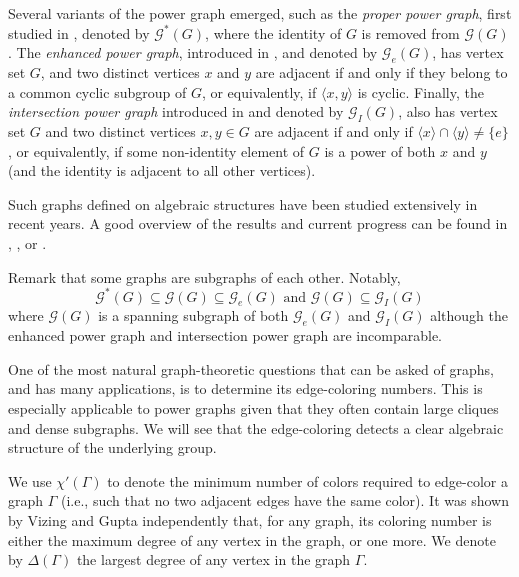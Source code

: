 \documentclass{article}
\theoremstyle{definition}
\theoremstyle{indentclaim}
\theoremstyle{named}
\theoremstyle{named}
\begin{document}
Several variants of the power graph emerged, such as the \textit{proper power graph}, first studied in \cite{MoghaddamfarRahbariyanShi}, denoted by $\mathscr{G}^{*}(G)$, where the identity of $G$ is removed from $\mathscr{G}(G)$. The \textit{enhanced power graph}, introduced in \cite{AalipourEtAl2017}, and denoted by $\mathscr{G}_{e}(G)$, has vertex set $G$, and two distinct vertices $x$ and $y$ are adjacent if and only if they belong to a common cyclic subgroup of $G$, or equivalently, if $\langle x,y\rangle$ is cyclic. Finally, the \textit{intersection power graph} introduced in \cite{Bera2018} and denoted by $\mathscr{G}_{I}(G)$, also has vertex set $G$ and two distinct vertices $x,y\in G$ are adjacent if and only if $\langle x\rangle\cap\langle y\rangle\neq\{e\}$, or equivalently, if some non-identity element of $G$ is a power of both $x$ and $y$ (and the identity is adjacent to all other vertices). 

Such graphs defined on algebraic structures have been studied extensively in recent years. A good overview of the results and current progress can be found in \cite{PJC3}, \cite{Grazian}, or \cite{Survey-PG-groups}. 

\medskip

Remark that some graphs are  subgraphs of each other. Notably, \[\mathscr{G}^*(G) \subseteq \mathscr{G}(G) \subseteq \mathscr{G}_e(G) \text{ and } \mathscr{G}(G) \subseteq \mathscr{G}_I(G)\] 
where $\mathscr{G}(G)$ is a spanning subgraph of both $\mathscr{G}_e(G)$ and $\mathscr{G}_I(G)$ although the enhanced power graph and intersection power graph are incomparable. 

\bigskip

One of the most natural graph-theoretic questions that can be asked of graphs, and has many applications, is to determine its edge-coloring numbers. This is especially applicable to power graphs given that they often contain large cliques and dense subgraphs. We will see that the edge-coloring detects a clear algebraic structure of the underlying group. 

We use $\chi'(\Gamma)$ to denote the minimum number of colors required to edge-color a graph $\Gamma$ (i.e., such that no two adjacent edges have the same color). It was shown by Vizing \cite{Vizing} and Gupta \cite{Gupta} independently that, for any graph, its coloring number is either the maximum degree of any vertex in the graph, or one more. We denote by $\Delta(\Gamma)$ the largest degree of any vertex in the graph $\Gamma$. 
\end{document}
